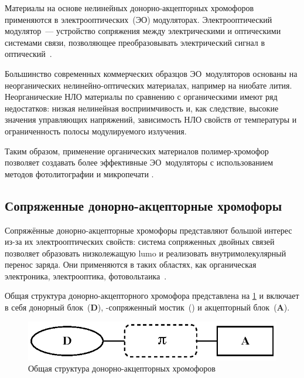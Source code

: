 Материалы на основе нелинейных донорно-акцепторных хромофоров применяются в электрооптических~(ЭО) модуляторах. Электрооптический модулятор~--- устройство сопряжения между электрическими и оптическими системами связи, позволяющее преобразовывать электрический сигнал в оптический~\cite{2016b}.

Большинство современных коммерческих образцов ЭО~модуляторов основаны на неорганических нелинейно-оптических материалах, например на ниобате лития. Неорганические НЛО материалы по сравнению с органическими имеют ряд недостатков: низкая нелинейная восприимчивость и, как следствие, высокие значения управляющих напряжений, зависимость НЛО свойств от температуры и ограниченность полосы модулируемого излучения.

Таким образом, применение органических материалов полимер-хромофор позволяет создавать более эффективные ЭО~модуляторы с использованием методов фотолитографии и микропечати \cite{Han2018}.

\subsection{Сопряженные донорно-акцепторные хромофоры}

Сопряжённые донорно-акцепторные хромофоры представляют большой интерес из-за их электрооптических свойств: система сопряженных двойных связей позволяет образовать низколежащую \ac{lumo} и реализовать внутримолекулярный перенос заряда. Они применяются в таких областях, как органическая электроника, электрооптика, фотовольтаика~\cite{Bures2014a}.

Общая структура донорно-акцепторного хромофора представлена на \ref{fig:D-p-A_chromophores} и включает в себя донорный блок~(\textbf{D}), \chempi-сопряженный мостик~({\Large\chempi}) и акцепторный блок~(\textbf{A}).
\begin{figure}
    \centering
    \includegraphics{sections/literature/img/D-p-A_chromophores.eps}
    \caption{Общая структура донорно-акцепторных хромофоров}
    \label{fig:D-p-A_chromophores}
\end{figure}

